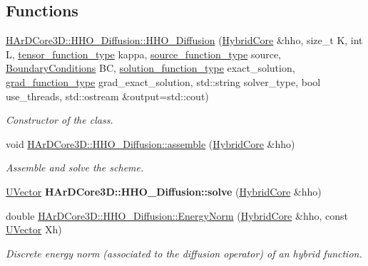 \subsection*{Functions}
\begin{DoxyCompactItemize}
\item 
\hyperlink{group__HHO__Diffusion_ga89f7078dcd1d4ffd848eed86cbfb00cf}{H\+Ar\+D\+Core3\+D\+::\+H\+H\+O\+\_\+\+Diffusion\+::\+H\+H\+O\+\_\+\+Diffusion} (\hyperlink{classHArDCore3D_1_1HybridCore}{Hybrid\+Core} \&hho, size\+\_\+t K, int L, \hyperlink{classHArDCore3D_1_1HHO__Diffusion_a640287c18811b16ef9136832e99879a1}{tensor\+\_\+function\+\_\+type} kappa, \hyperlink{classHArDCore3D_1_1HHO__Diffusion_a2e1e24f77c08b2edbd8d836a91f6b08b}{source\+\_\+function\+\_\+type} source, \hyperlink{classBoundaryConditions}{Boundary\+Conditions} BC, \hyperlink{classHArDCore3D_1_1HHO__Diffusion_ab3104f23491ecb92d2701db651380148}{solution\+\_\+function\+\_\+type} exact\+\_\+solution, \hyperlink{classHArDCore3D_1_1HHO__Diffusion_a35b1f1e3277f1d675b12d4e7533e3d23}{grad\+\_\+function\+\_\+type} grad\+\_\+exact\+\_\+solution, std\+::string solver\+\_\+type, bool use\+\_\+threads, std\+::ostream \&output=std\+::cout)
\begin{DoxyCompactList}\small\item\em Constructor of the class. \end{DoxyCompactList}\item 
\mbox{\label{group__HHO__Diffusion_ga82476d19a0312e0b370a1f6100d863d1}} 
void \hyperlink{group__HHO__Diffusion_ga82476d19a0312e0b370a1f6100d863d1}{H\+Ar\+D\+Core3\+D\+::\+H\+H\+O\+\_\+\+Diffusion\+::assemble} (\hyperlink{classHArDCore3D_1_1HybridCore}{Hybrid\+Core} \&hho)
\begin{DoxyCompactList}\small\item\em Assemble and solve the scheme. \end{DoxyCompactList}\item 
\mbox{\label{group__HHO__Diffusion_ga582be64d213833c883137e143839c370}} 
\hyperlink{classHArDCore3D_1_1UVector}{U\+Vector} {\bfseries H\+Ar\+D\+Core3\+D\+::\+H\+H\+O\+\_\+\+Diffusion\+::solve} (\hyperlink{classHArDCore3D_1_1HybridCore}{Hybrid\+Core} \&hho)
\item 
\mbox{\label{group__HHO__Diffusion_ga18588364740b7c9a8fc25213499eaadd}} 
double \hyperlink{group__HHO__Diffusion_ga18588364740b7c9a8fc25213499eaadd}{H\+Ar\+D\+Core3\+D\+::\+H\+H\+O\+\_\+\+Diffusion\+::\+Energy\+Norm} (\hyperlink{classHArDCore3D_1_1HybridCore}{Hybrid\+Core} \&hho, const \hyperlink{classHArDCore3D_1_1UVector}{U\+Vector} Xh)
\begin{DoxyCompactList}\small\item\em Discrete energy norm (associated to the diffusion operator) of an hybrid function. \end{DoxyCompactList}\end{DoxyCompactItemize}


